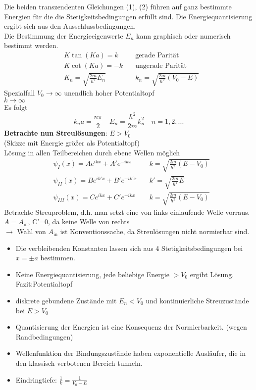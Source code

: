 \documentclass[10pt,article,colorback,accentcolor=tud9d]{scrartcl}
\begin{document}
Die beiden transzendenten Gleichungen (1), (2) führen auf ganz bestimmte Energien für die die Stetigkeitsbedingungen erfüllt sind. Die Energiequantisierung ergibt sich aus den Ausschlussbedingungen.\\
Die Bestimmung der Energieeigenwerte $E_n$ kann graphisch oder numerisch bestimmt werden.
\begin{align}
&K\tan(Ka)=k\quad &\text{gerade Parität}\\
&K\cot(Ka)=-k\quad &\text{ungerade Parität}\\
&K_n=\sqrt{\frac{2m}{\hbar^2}E_n}\quad&k_n=\sqrt{\frac{2m}{\hbar^2}(V_0-E)}
\end{align}
Spezialfall $V_0\rightarrow\infty$ unendlich hoher Potentialtopf\\
$k\rightarrow\infty$\\
Es folgt 
\begin{equation}
k_na=\frac{n\pi}{2} \quad E_n=\frac{\hbar^2}{2m}k_n^2\quad n=1,2,...
\end{equation}
\textbf{Betrachte nun Streulösungen}: $E>V_0$\\
(Skizze mit Energie größer als Potentialtopf)\\
Lösung in allen Teilbereichen durch ebene Wellen möglich
\begin{align}
&\psi_I(x)=Ae^{ikx}+A'e^{-ikx}\quad &k=\sqrt{\frac{2m}{\hbar^2}(E-V_0)}\\
&\psi_{II}(x)=Be^{ik'x}+B'e^{-ik'x}\quad &k'=\sqrt{\frac{2m}{\hbar^2}E}\\
&\psi_{III}(x)=Ce^{ikx}+C'e^{-ikx}\quad &k=\sqrt{\frac{2m}{\hbar^2}(E-V_0)}
\end{align}
Betrachte Streuproblem, d.h. man setzt eine von links einlaufende Welle vorraus.\\
$A=A_{\text{in}}$, C'=0, da keine Welle von rechts\\
$\rightarrow$ Wahl von $A_{\text{in}}$ ist Konventionssache, da Streulösungen nicht normierbar sind.
\begin{itemize}
\item Die verbleibenden Konstanten lassen sich aus 4 Stetigkeitsbedingungen bei $x=\pm a$ bestimmen.
\item Keine Energiequantisierung, jede beliebige Energie $>V_0$ ergibt Lösung.\\
Fazit:Potentialtopf
\item diskrete gebundene Zustände mit $E_n<V_0$ und kontinuierliche Streuzustände bei $E>V_0$
\item Quantisierung der Energien ist eine Konsequenz der Normierbarkeit. (wegen Randbedingungen)
\item Wellenfunktion der Bindungszustände haben exponentielle Ausläufer, die in den klassisch verbotenen Bereich tunneln.
\item Eindringtiefe: $\frac{1}{k}=\frac{1}{V_0-E}$
\end{itemize}
\end{document}
